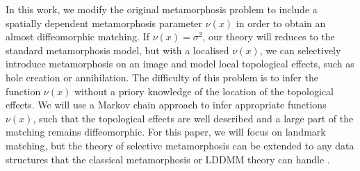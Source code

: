 \documentclass[runningheads]{llncs}
\begin{document}
In this work, we modify the original metamorphosis problem to include a
spatially dependent metamorphosis parameter $\nu(x)$ in order to obtain an
almost diffeomorphic matching. If $\nu(x) = \sigma^2$, our theory will reduces
to the standard metamorphosis model, but with a localised $\nu(x)$, we can
selectively introduce metamorphosis on an image and model local topological
effects, such as hole creation or annihilation.  The difficulty of this problem
is to infer the function $\nu(x)$ without a priory knowledge of the location of
the topological effects.  We will use a Markov chain approach to infer
appropriate functions $\nu(x)$, such that the topological effects are well
described and a large part of the matching remains diffeomorphic.  For this
paper, we will focus on landmark matching, but the theory of selective
metamorphosis can be extended to any data structures that the classical
metamorphosis or LDDMM theory can handle \cite{bockarnaudoncotter2019}.
\end{document}
